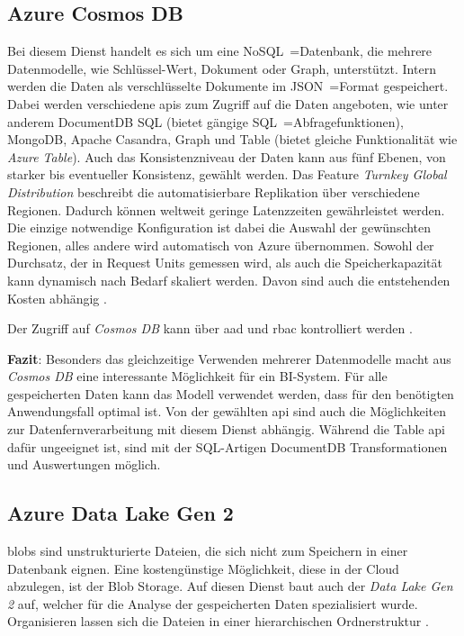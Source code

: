 \subsection{Azure Cosmos DB} \label{sec:grundlagen:azure_dienste:cosmosDB}
Bei diesem Dienst handelt es sich um eine NoSQL~=Datenbank, die mehrere Datenmodelle, wie Schlüssel-Wert, Dokument oder Graph, unterstützt. Intern werden die Daten als verschlüsselte Dokumente im JSON~=Format gespeichert. Dabei werden verschiedene \acp{api} zum Zugriff auf die Daten angeboten, wie unter anderem DocumentDB SQL (bietet gängige SQL~=Abfragefunktionen), MongoDB, Apache Casandra, Graph und Table (bietet gleiche Funktionalität wie \textit{Azure Table}). Auch das Konsistenzniveau der Daten kann aus fünf Ebenen, von starker bis eventueller Konsistenz, gewählt werden. Das Feature \textit{Turnkey Global Distribution} beschreibt die automatisierbare Replikation über verschiedene Regionen. Dadurch können weltweit geringe Latenzzeiten gewährleistet werden. Die einzige notwendige Konfiguration ist dabei die Auswahl der gewünschten Regionen, alles andere wird automatisch von Azure übernommen. Sowohl der Durchsatz, der in Request
Units gemessen wird, als auch die Speicherkapazität kann dynamisch nach Bedarf skaliert werden. Davon sind auch die entstehenden Kosten abhängig \cite{guay_paz_microsoft_2018}\cite{mrzyglod_hands-azure_2018}.

Der Zugriff auf \textit{Cosmos DB} kann über \ac{aad} und \ac{rbac} kontrolliert werden \cite{msdoc_21_cosmos_rbac}.

\textbf{Fazit}: Besonders das gleichzeitige Verwenden mehrerer Datenmodelle macht aus \textit{Cosmos DB} eine interessante Möglichkeit für ein BI-System. Für alle gespeicherten Daten kann das Modell verwendet werden, dass für den benötigten Anwendungsfall optimal ist. Von der gewählten \ac{api} sind auch die Möglichkeiten zur Datenfernverarbeitung mit diesem Dienst abhängig. Während die Table \ac{api} dafür ungeeignet ist, sind mit der SQL-Artigen DocumentDB Transformationen und Auswertungen möglich.

\subsection{Azure Data Lake Gen 2} \label{sec:grundlagen:azure_dienste:dataLake}
\acp{blob} sind unstrukturierte Dateien, die sich nicht zum Speichern in einer Datenbank eignen. Eine kostengünstige Möglichkeit, diese in der Cloud abzulegen, ist der Blob Storage. Auf diesen Dienst baut auch der \textit{Data Lake Gen 2} auf, welcher für die Analyse der gespeicherten Daten spezialisiert wurde. Organisieren lassen sich die Dateien in einer hierarchischen Ordnerstruktur \cite{soh_microsoft_2020}.

